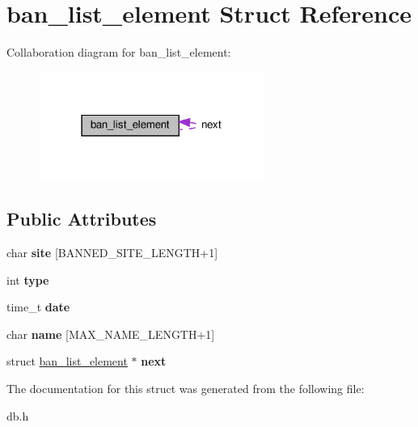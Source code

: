 \hypertarget{structban__list__element}{}\section{ban\+\_\+list\+\_\+element Struct Reference}
\label{structban__list__element}


Collaboration diagram for ban\+\_\+list\+\_\+element\+:
\nopagebreak
\begin{figure}[H]
\begin{center}
\leavevmode
\includegraphics[width=210pt]{structban__list__element__coll__graph}
\end{center}
\end{figure}
\subsection*{Public Attributes}
\begin{DoxyCompactItemize}
\item 
\mbox{\label{structban__list__element_a62b7fad7417e89973ed3ed464e5fb40f}} 
char {\bfseries site} \mbox{[}B\+A\+N\+N\+E\+D\+\_\+\+S\+I\+T\+E\+\_\+\+L\+E\+N\+G\+TH+1\mbox{]}
\item 
\mbox{\label{structban__list__element_ac3c01af37fb9d47f1e0062725dc308c4}} 
int {\bfseries type}
\item 
\mbox{\label{structban__list__element_a22875f625f142580a1c7c0cf5ce19b0f}} 
time\+\_\+t {\bfseries date}
\item 
\mbox{\label{structban__list__element_a379a18a30e89950584e1e62db3aaed21}} 
char {\bfseries name} \mbox{[}M\+A\+X\+\_\+\+N\+A\+M\+E\+\_\+\+L\+E\+N\+G\+TH+1\mbox{]}
\item 
\mbox{\label{structban__list__element_aae37b7c3462b0271e4f5c0e1715ecb7f}} 
struct \hyperlink{structban__list__element}{ban\+\_\+list\+\_\+element} $\ast$ {\bfseries next}
\end{DoxyCompactItemize}


The documentation for this struct was generated from the following file\+:\begin{DoxyCompactItemize}
\item 
db.\+h\end{DoxyCompactItemize}
